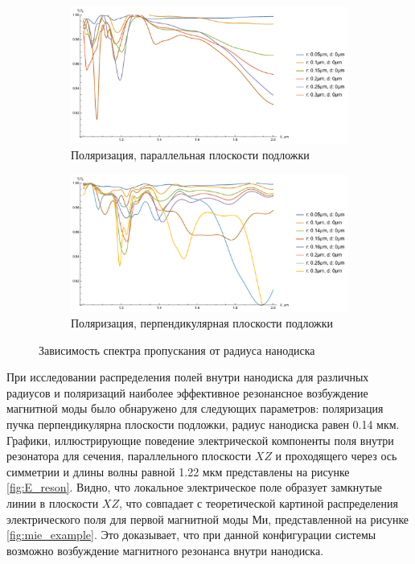 \begin{figure}[h]
	\begin{subfigure}[b]{\textwidth}
		\centering
		\includegraphics[width=.9\textwidth]{img/total_d0_theta_0}
		\caption{Поляризация, параллельная плоскости подложки}
		\label{fig:1x_fixed_d_theta_0}
	\end{subfigure}

	\begin{subfigure}[b]{\textwidth}
		\centering
		\includegraphics[width=.9\textwidth]{img/total_d0_theta_90}
		\caption{Поляризация, перпендикулярная плоскости подложки}
		\label{fig:1x_fixed_d_theta_90}
	\end{subfigure}
  
  	\caption{Зависимость спектра пропускания от радиуса нанодиска}
  	\label{fig:1x_fixed_d}
\end{figure}

При исследовании распределения полей внутри нанодиска для различных радиусов и поляризаций наиболее эффективное резонансное возбуждение магнитной моды было обнаружено для следующих параметров: поляризация пучка перпендикулярна плоскости подложки, радиус нанодиска равен 0.14 мкм. Графики, иллюстрирующие поведение электрической компоненты поля внутри резонатора для сечения, параллельного плоскости $XZ$ и проходящего через ось симметрии и длины волны равной 1.22 мкм представлены на рисунке \ref{fig:E_reson}. Видно, что локальное электрическое поле образует замкнутые линии в плоскости $XZ$, что совпадает с теоретической картиной распределения электрического поля для первой магнитной моды Ми, представленной на рисунке \ref{fig:mie_example}. Это доказывает, что при данной конфигурации системы возможно возбуждение магнитного резонанса внутри нанодиска.

